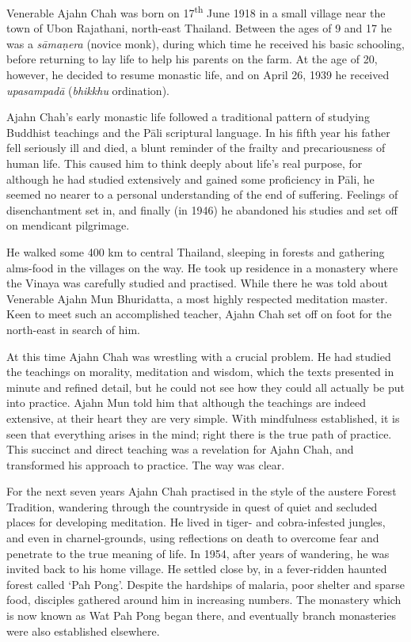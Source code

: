 
Venerable Ajahn Chah was born on 17\textsuperscript{th} June 1918 in a small village near
the town of Ubon Rajathani, north-east Thailand. Between the ages of 9
and 17 he was a \emph{sāmaṇera} (novice monk), during which time he
received his basic schooling, before returning to lay life to help his
parents on the farm. At the age of 20, however, he decided to resume
monastic life, and on April 26, 1939 he received \emph{upasampadā}
(\emph{bhikkhu} ordination).

Ajahn Chah's early monastic life followed a traditional pattern of
studying Buddhist teachings and the Pāli scriptural language. In his
fifth year his father fell seriously ill and died, a blunt reminder of
the frailty and precariousness of human life. This caused him to think
deeply about life's real purpose, for although he had studied
extensively and gained some proficiency in Pāli, he seemed no nearer to
a personal understanding of the end of suffering. Feelings of
disenchantment set in, and finally (in 1946) he abandoned his studies
and set off on mendicant pilgrimage. 

He walked some 400 km to central Thailand, sleeping in forests and
gathering alms-food in the villages on the way. He took up residence in a
monastery where the Vinaya was carefully studied and practised. While
there he was told about Venerable Ajahn Mun Bhuridatta, a most highly
respected meditation master. Keen to meet such an accomplished teacher, 
Ajahn Chah set off on foot for the north-east in search of him. 

At this time Ajahn Chah was wrestling with a crucial problem. He had
studied the teachings on morality, meditation and wisdom, which the
texts presented in minute and refined detail, but he could not see how
they could all actually be put into practice. Ajahn Mun told him that
although the teachings are indeed extensive, at their heart they are
very simple. With mindfulness established, it is seen that everything
arises in the mind; right there is the true path of practice. This
succinct and direct teaching was a revelation for Ajahn Chah, and
transformed his approach to practice. The way was clear. 

For the next seven years Ajahn Chah practised in the style of the
austere Forest Tradition, wandering through the countryside in quest of
quiet and secluded places for developing meditation. He lived in tiger-
and cobra-infested jungles, and even in charnel-grounds, using
reflections on death to overcome fear and penetrate to the true meaning
of life. In 1954, after years of wandering, he was invited back to his
home village. He settled close by, in a fever-ridden haunted forest
called `Pah Pong'. Despite the hardships of malaria, poor shelter and
sparse food, disciples gathered around him in increasing numbers. The
monastery which is now known as Wat Pah Pong began there, and eventually
branch monasteries were also established elsewhere. 

